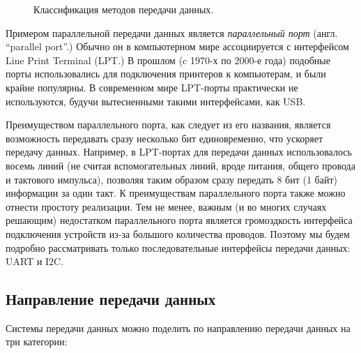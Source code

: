 \documentclass[../sparc.tex]{subfiles}
\begin{document}
\begin{figure}[H]
  \centering
  \caption{Классификация методов передачи данных.}
  \label{fig:communication-data-transfer-categories}
\end{figure}

Примером параллельной передачи данных является \emph{параллельный порт} (англ.
``parallel port''.) Обычно он в компьютерном мире ассоциируется с интерфейсом
Line Print Terminal (\gls{LPT}.)  В прошлом (c 1970-х по 2000-е года) подобные
порты использовались для подключения принтеров к компьютерам, и были крайне
популярны.  В современном мире LPT-порты практически не используются, будучи
вытесненными такими интерфейсами, как USB.

Преимуществом параллельного порта, как следует из его названия, является
возможность передавать сразу несколько бит единовременно, что ускоряет передачу
данных.  Например, в LPT-портах для передачи данных использовалось восемь линий
(не считая вспомогательных линий, вроде питания, общего провода и тактового
импульса), позволяя таким образом сразу передать 8 бит (1 байт) информации за
один такт.  К преимуществам параллельного порта также можно отнести простоту
реализации.  Тем не менее, важным (и во многих случаях решающим) недостатком
параллельного порта является громоздкость интерфейса подключения устройств из-за
большого количества проводов.  Поэтому мы будем подробно рассматривать только
последовательные интерфейсы передачи данных: \gls{UART} и I2C.


\subsection{Направление передачи данных}

Системы передачи данных можно поделить по направлению передачи данных на три
категории:
\end{document}
